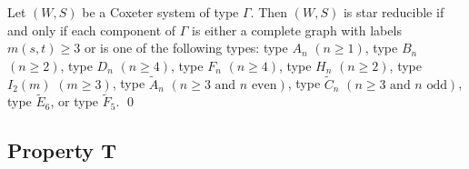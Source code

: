 \begin{proposition}\label{prop:starredcoxgrp}
	Let $(W,S)$ be a Coxeter system of type $\Gamma$. Then $(W,S)$ is star reducible if and only if each component of $\Gamma$ is either a complete graph with labels $m(s,t)\geq 3$ or is one of the following types: type $A_n$ $(n \geq 1)$, type $B_n$ $(n \geq 2)$, type $D_n$ $(n \geq 4)$, type $F_n$ $(n \geq 4)$, type $H_n$ $(n \geq 2)$, type $I_2(m)$ $(m \geq 3)$, type $\widetilde{A}_{n}$ $(n \geq 3 \textrm{ and } n \textrm{ even})$, type $\widetilde{C}_{n}$ $(n\geq 3 \textrm{ and } n \textrm{ odd})$, type $\widetilde{E}_6$, or type $\widetilde{F}_5$. \qed
\end{proposition}    


\subsection{Property T}\label{sec:Tavoid}

